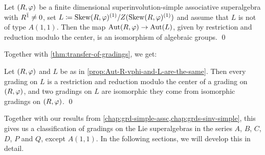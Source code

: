 \begin{prop}\label{prop:Aut-R-vphi-and-L-are-the-same}
    Let $(R, \varphi)$ be a finite dimensional superinvolution-simple associative superalgebra with $R^{\bar1} \neq 0$, set 
    $L \coloneqq \operatorname{Skew}(R, \varphi)^{(1)}/Z( \operatorname{Skew}(R, \varphi)^{(1)} )$ and assume that $L$ is not of type $A(1,1)$. 
    Then the map $\operatorname{Aut}(R, \varphi) \to \operatorname{Aut}(L)$, given by restriction and reduction modulo the center, is an isomorphism of algebraic groups. \qed
\end{prop}

Together with \cref{thm:transfer-of-gradings}, we get:

\begin{cor}\label{cor:transfer-R-vphi-to-L}
    Let $(R, \varphi)$ and $L$ be as in \cref{prop:Aut-R-vphi-and-L-are-the-same}. 
    Then every grading on $L$ is a restriction and reduction modulo the center of a grading on $(R, \varphi)$, and two gradings on $L$ are isomorphic \IFF they come from isomorphic gradings on $(R, \varphi)$. \qed
\end{cor}

Together with our results from \cref{chap:grd-simple-assc,chap:grds-sinv-simple}, this gives us a classification of gradings on the Lie superalgebras in the series $A$, $B$, $C$, $D$, $P$ and $Q$, except $A(1,1)$. 
In the following sections, we will develop this in detail.